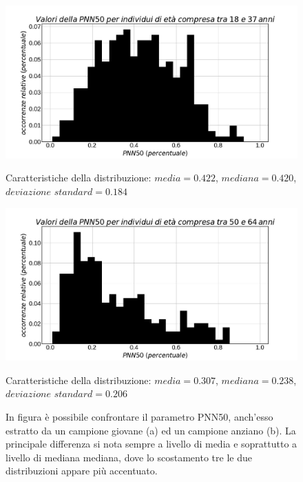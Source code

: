 \documentclass[a4paper, 12pt]{book}
\begin{document}
\begin{figure}[htbp]
\centering
\begin{minipage}[c]{.5\textwidth}
\centering%
\includegraphics[width=\textwidth]{PNN50-y.jpg}
\caption{Caratteristiche della distribuzione: $media=0.422$, $mediana=0.420$, $deviazione$ $standard = 0.184$}
\end{minipage}%
\hspace{10mm}%
\begin{minipage}[c]{.5\textwidth}
\centering%
\includegraphics[width=\textwidth]{PNN50-o.jpg}
\caption{Caratteristiche della distribuzione: $media=0.307$, $mediana=0.238$, $deviazione$ $standard = 0.206$}
\end{minipage}
\caption{In figura è possibile confrontare il parametro PNN50, anch'esso estratto da un campione giovane (a) ed un campione anziano (b).
    La principale differenza si nota sempre a livello di media e soprattutto a livello di mediana mediana, dove lo scostamento tre le due distribuzioni appare più accentuato.
}
\label{fig:PNN50}
\end{figure}
\end{document}

